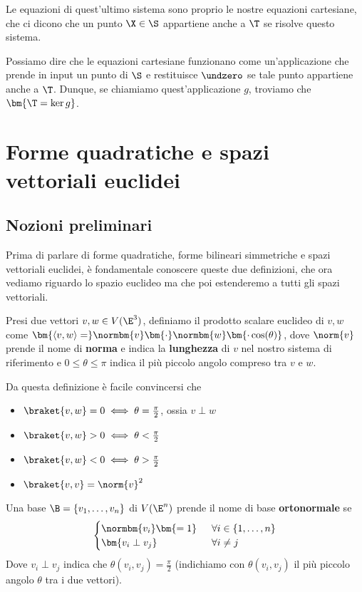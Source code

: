 \documentclass[11pt, a4paper, titlepage, oneside]{scrbook}
\begin{document}
Le equazioni di quest'ultimo sistema sono proprio le nostre equazioni cartesiane, che ci dicono che un punto $\X \in \S$ appartiene anche a $\T$ se risolve questo sistema. 

Possiamo dire che le equazioni cartesiane funzionano come un'applicazione che prende in input un punto di $\S$ e restituisce $\undzero$ se tale punto appartiene anche a $\T$. Dunque, se chiamiamo quest'applicazione $g$, troviamo che $\bm{\T = \ker g}$.

\chapter{Forme quadratiche e spazi vettoriali euclidei}

\section{Nozioni preliminari}

Prima di parlare di forme quadratiche, forme bilineari simmetriche e spazi vettoriali euclidei, è fondamentale conoscere queste due definizioni, che ora vediamo riguardo lo spazio euclideo ma che poi estenderemo a tutti gli spazi vettoriali.

\begin{Definizione}
\label{def-prodotto-scalare-euclideo-E^3}
Presi due vettori $v,w \in V(\E^3)$, definiamo il prodotto scalare euclideo di $v,w$ come $ \bm{\langle v,w \rangle =} \normbm{v} \bm{\cdot} \normbm{w} \bm{\cdot \cos(\theta)}$, dove $\norm{v}$ prende il nome di \textbf{norma} e indica la \textbf{lunghezza} di $v$ nel nostro sistema di riferimento e $0 \leq \theta \leq \pi$ indica il più piccolo angolo compreso tra $v$ e $w$.
\end{Definizione}

Da questa definizione è facile convincersi che
\begin{itemize}
    \item $\braket{v,w} = 0 \iff \theta = \frac{\pi}{2}$, ossia $v \perp w$
    \item $\braket{v,w} > 0 \iff \theta < \frac{\pi}{2}$
    \item $\braket{v,w} < 0 \iff \theta > \frac{\pi}{2}$
    \item $\braket{v,v} = \norm{v}^2$
\end{itemize}

\begin{Definizione}
\label{def-base-ortonormale}
Una base $\B = \{v_1, \ldots, v_n\}$ di $V(\E^n)$ prende il nome di base \textbf{ortonormale} se 
\[
\begin{cases}
\normbm{v_i} \bm{= 1} &\enspace \forall i \in \{1, \ldots, n\}  \\
\bm{v_i \perp v_j} &\enspace \forall i \neq j 
\end{cases}
\]
Dove $v_i \perp v_j$ indica che $\theta(v_i, v_j) = \frac{\pi}{2}$ (indichiamo con $\theta(v_i,v_j)$ il più piccolo angolo $\theta$ tra i due vettori).
\end{Definizione}
\end{document}
